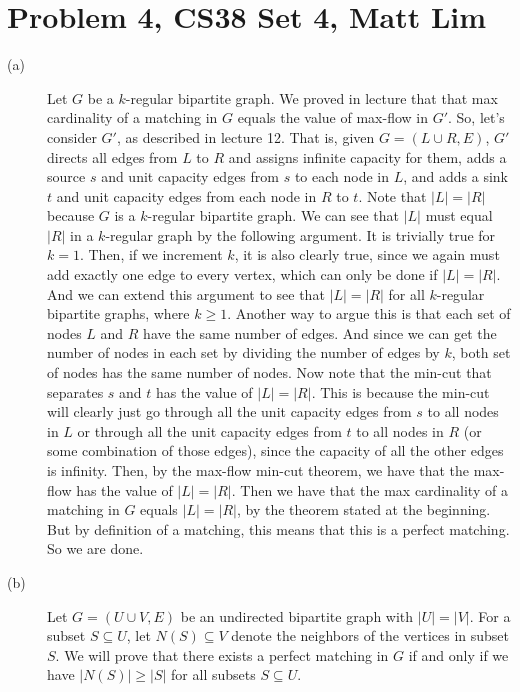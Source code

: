 \documentclass{article}
\begin{document}
\section*{Problem 4, CS38 Set 4, Matt Lim}
\begin{description}
    \item[(a)]Let $G$ be a $k$-regular bipartite graph.
        We proved in lecture that that max cardinality of a matching in $G$ equals the
        value of max-flow in $G'$. So, let's consider $G'$, as described in lecture 12.
        That is, given $G = (L \cup R, E)$, $G'$ directs all edges from $L$ to $R$ and
        assigns infinite capacity for them, adds a source $s$ and unit
        capacity edges from $s$ to each node in $L$, and adds a sink $t$ and unit
        capacity edges from each node in $R$ to $t$.
        Note that $|L| = |R|$ because $G$ is a $k$-regular bipartite graph.
        We can see that $|L|$ must equal
        $|R|$ in a $k$-regular graph by the following argument. It is trivially true for
        $k=1$. Then, if we increment $k$, it is also clearly true, since we again must
        add exactly one edge to every vertex, which can only be done if $|L| = |R|$. And
        we can extend this argument to see that $|L| = |R|$ for all $k$-regular
        bipartite graphs, where $k \ge 1$. Another way to argue this is that
        each set of nodes $L$ and $R$ have the same number of edges. And since
        we can get the number of nodes in each set by dividing the number of
        edges by $k$, both set of nodes has the same number of nodes. Now note that the min-cut that
        separates $s$ and $t$ has the value of $|L| = |R|$.
        This is because the min-cut will clearly just go through all the unit
        capacity edges from $s$ to all nodes in $L$ or through all the unit
        capacity edges from $t$ to all nodes in $R$ (or some combination of
        those edges), since the capacity of all the other edges is infinity.
        Then, by the max-flow min-cut theorem, we have that the max-flow
        has the value of $|L| = |R|$.  Then we have that the max cardinality of a matching
        in $G$ equals $|L| = |R|$, by the theorem stated at the beginning. But by definition of a
        matching, this means that this is a perfect matching. So we are done.
    \item[(b)] Let $G = (U \cup V, E)$ be an undirected bipartite graph with $|U|
        = |V|$. For a subset $S \subseteq U$, let $N(S) \subseteq V$ denote the
        neighbors of the vertices in subset $S$. We will prove that there exists
        a perfect matching in $G$ if and only if we have $|N(S)| \ge |S|$ for
        all subsets $S \subseteq U$.


\end{description}
\end{document}

